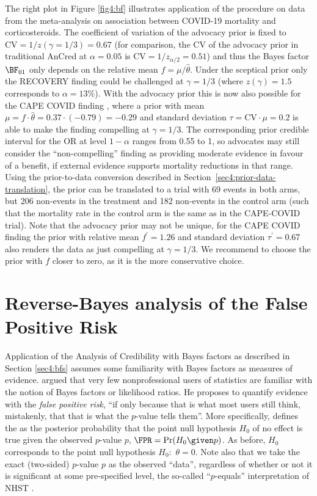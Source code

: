 The right plot in Figure \ref{fig4:bf} illustrates application of the procedure
on data from the meta-analysis on association between COVID-19 mortality and
corticosteroids. The coefficient of variation of the advocacy prior is fixed to
$\text{CV} = 1/z(\gamma=1/3) = 0.67$ (for comparison, the CV of the advocacy
prior in traditional AnCred at $\alpha = 0.05$ is
$\text{CV} = 1/z_{\alpha/2}= 0.51$) and thus the Bayes factor $\BF_{01}$ only
depends on the relative mean $f = \mu/\hat{\theta}$. Under the sceptical prior
only the RECOVERY finding could be challenged at $\gamma = 1/3$ (where
$z(\gamma)=1.5$ corresponds to $\alpha=13$\%). With the advocacy prior this is
now also possible for the CAPE COVID finding \citep{Dequin2020}, where a prior
with mean $\mu = f \cdot \hat{\theta} = 0.37 \cdot (-0.79) = -0.29$ and standard
deviation $\tau = \text{CV} \cdot \mu = 0.2$ is able to make the finding
compelling at $\gamma = 1/3$. The corresponding prior credible interval for the
OR at level $1-\alpha$ ranges from 0.55 to 1, so advocates may still consider
the ``non-compelling'' finding as providing moderate evidence in favour of a
benefit, if external evidence supports mortality reductions in that range. Using
the prior-to-data conversion described in
Section~\ref{sec4:prior-data-translation}, the prior can be translated to a
trial with 69 events in both arms, but 206 non-events in the treatment and 182
non-events in the control arm (such that the mortality rate in the control arm
is the same as in the CAPE-COVID trial). Note that the advocacy prior may not be
unique, \eg{} for the CAPE COVID finding the prior with relative mean
$f^\prime = 1.26$ and standard deviation $\tau^\prime = 0.67$ also renders the
data as just compelling at $\gamma = 1/3$. We recommend to choose the prior with
$f$ closer to zero, as it is the more conservative choice.

\section{Reverse-Bayes analysis of the False Positive Risk}
\label{sec4:p.equals}

Application of the Analysis of Credibility with Bayes factors as described in
Section \ref{sec4:bfs} assumes some familiarity with Bayes factors as measures
of evidence. \citet{Colquhoun2019} argued that very few nonprofessional users of
statistics are familiar with the notion of Bayes factors or likelihood ratios.
He proposes to quantify evidence with the \emph{false positive risk}, ``if only
because that is what most users still think, mistakenly, that that is what the
$p$-value tells them''. More specifically, \citet{Colquhoun2019} defines the
\FPR{} as the posterior probability that the point null hypothesis $H_0$ of no
effect is true given the observed $p$-value $p$, \ie{} $\FPR = \Pr(H_0 \given p)$.
As before, $H_0$ corresponds to the point null hypothesis $H_0\colon$
$\theta = 0$. Note also that we take the exact (two-sided) $p$-value $p$ as the
observed ``data'', regardless of whether or not it is significant at some
pre-specified level, the so-called ``$p$-equals'' interpretation of NHST
\citep{Colquhoun2017}.


